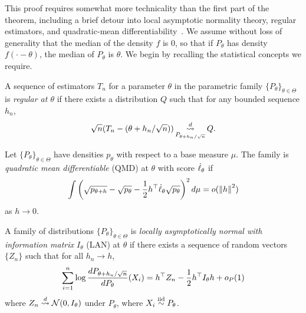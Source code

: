 This proof requires somewhat more technicality than the first part of the
theorem, including a brief detour into local asymptotic normality theory,
regular estimators, and quadratic-mean
differentiability~\cite[cf.]{VanDerVaart98}.
We assume without loss of generality that the median of the density
$f$ is 0, so that if $P_\theta$ has density $f(\cdot - \theta)$, the
median of $P_\theta$ is $\theta$.
We begin by recalling the statistical concepts we require.
\begin{definition}
  \label{definition:regular-estimator}
  A sequence of estimators $T_n$ for a parameter $\theta$ in the parametric
  family $\{P_\theta\}_{\theta \in \Theta}$ is \emph{regular at $\theta$} if
  there exists a distribution $Q$ such that for any bounded sequence
  $h_n$,
  \begin{equation*}
    \sqrt{n}(T_n - (\theta + h_n / \sqrt{n}))
    \mathop{\stackrel{d}{\rightsquigarrow}}_{P_{\theta + h_n/\sqrt{n}}}
    Q.
  \end{equation*}
\end{definition}
\begin{definition}
  \label{definition:qmd}
  Let $\{P_\theta\}_{\theta \in \Theta}$ have densities $p_\theta$
  with respect to a base measure $\mu$. The family
  is \emph{quadratic mean differentiable} (QMD) at
  $\theta$ with score $\dot{\ell}_\theta$ if
  \begin{equation}
    \label{eqn:qmd}
    \int \left(\sqrt{p_{\theta + h}} - \sqrt{p_\theta}
    - \frac{1}{2} h^\top \dot{\ell}_\theta\sqrt{p_\theta} \right)^2 d\mu
    = o(\left\|{h}\right\|^2)
  \end{equation}
  as $h \to 0$.
\end{definition}
\begin{definition}
  \label{definition:lan}
  A family of distributions $\{P_\theta\}_{\theta \in \Theta}$ is
  \emph{locally asymptotically normal with information matrix $I_\theta$} (LAN)
  at
  $\theta$ if there exists a sequence of random vectors $\{Z_n\}$ such that for
  all $h_n \to h$,
  \begin{equation*}
    \sum_{i = 1}^n \log \frac{dP_{\theta + h_n/\sqrt{n}}}{dP_\theta}
    {\color{black} {(X_i)}}
    = h^\top Z_n - \frac{1}{2} h^\top I_\theta h + o_P(1)
  \end{equation*}
  where $Z_n \stackrel{d}{\rightsquigarrow} \mathcal{N}(0, I_\theta)$ under $P_\theta$, where
  $X_i \stackrel{\textup{iid}}{\sim} P_\theta$.
\end{definition}

